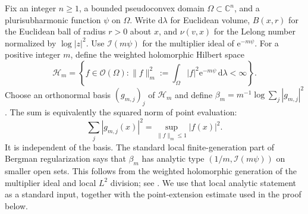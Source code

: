 Fix an integer $n\geq1$, a bounded pseudoconvex domain $\Omega\subset\mathbb C^n$, and a plurisubharmonic function $\psi$ on $\Omega$. Write $\mathrm{d}\lambda$ for Euclidean volume, $B(x,r)$ for the Euclidean ball of radius $r>0$ about $x$, and $\nu(v,x)$ for the Lelong number normalized by $\log|z|^2$. Use $\mathcal I(m\psi)$ for the multiplier ideal of $\mathrm{e}^{-m\psi}$. For a positive integer $m$, define the weighted holomorphic Hilbert space
\[
 \mathcal H_m=\left\{f\in\mathcal O(\Omega):
          \|f\|_m^2:=\int_\Omega|f|^2\mathrm{e}^{-m\psi}\,\mathrm{d}\lambda<\infty\right\}.
\]
Choose an orthonormal basis $(g_{m,j})_j$ of $\mathcal H_m$ and define $\beta_m=m^{-1}\log\sum_j|g_{m,j}|^2$. The sum is equivalently the squared norm of point evaluation:
\[
 \sum_j|g_{m,j}(x)|^2
   =\sup_{\|f\|_m\leq1}|f(x)|^2.
\]
It is independent of the basis. The standard local finite-generation part of Bergman regularization says that $\beta_m$ has analytic type
$(1/m,\mathcal I(m\psi))$ on smaller open sets. This follows from the weighted holomorphic generation of the multiplier ideal and local $L^2$ division; see \cite[Proposition 5.7 and Section 14.A]{DemAM11}. We use that local analytic statement as a standard input, together with the point-extension estimate used in the proof below.

